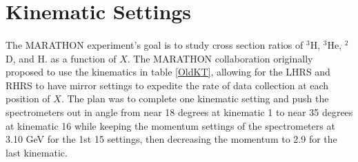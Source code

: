 
\section{Kinematic Settings}\label{sec:kin}
\paragraph{} The MARATHON experiment's goal is to study cross section ratios of $^3$H, $^3$He, $^2$D, and H. as a function of $X$. The MARATHON collaboration originally proposed to use the kinematics in table \ref{OldKT}, allowing for the LHRS and RHRS to have mirror settings to expedite the rate of data collection at each position of $X$. The plan was to complete one kinematic setting and push the spectrometers out in angle from near 18 degrees at kinematic 1 to near 35 degrees at kinematic 16 while keeping the momentum settings of the spectrometers at 3.10 GeV for the 1st 15 settings, then decreasing the momentum to 2.9 for the last kinematic. 


